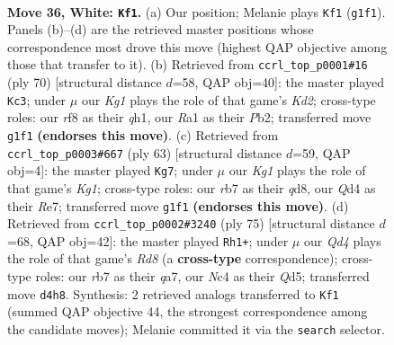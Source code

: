 \documentclass[11pt]{article}
\begin{document}
\clearpage

\begin{figure}[p]\centering
\begin{subfigure}{0.46\textwidth}\centering
\resizebox{\linewidth}{!}{%
\newchessgame
\chessboard[
  setfen={5rk1/1r5p/1p6/p7/2NQ3P/8/PP3PP1/R5K1 w - - 9 36},
  showmover=false,
  pgfstyle=straightmove, color=movearrow, markmove={g1-f1}
]}
\caption{}
\end{subfigure}\hfill
\begin{subfigure}{0.46\textwidth}\centering
\resizebox{\linewidth}{!}{%
\newchessgame
\chessboard[
  setfen={k3r3/1p3p2/p2p4/8/3Q1R1P/8/1PPK1P2/7q w - - 4 36},
  showmover=false,
  pgfstyle=straightmove, color=movearrow, markmove={d2-c3}
]}
\caption{}
\end{subfigure}
\\[4pt]
\begin{subfigure}{0.46\textwidth}\centering
\resizebox{\linewidth}{!}{%
\newchessgame
\chessboard[
  setfen={3Q2k1/4r2p/p3q1p1/1p6/8/7P/P4PP1/2R3K1 b - - 3 32},
  showmover=false,
  pgfstyle=straightmove, color=movearrow, markmove={g8-g7}
]}
\caption{}
\end{subfigure}\hfill
\begin{subfigure}{0.46\textwidth}\centering
\resizebox{\linewidth}{!}{%
\newchessgame
\chessboard[
  setfen={8/Q7/2p2kp1/3qp2p/8/1P5P/2R2PPK/3r4 b - - 2 38},
  showmover=false,
  pgfstyle=straightmove, color=movearrow, markmove={d1-h1}
]}
\caption{}
\end{subfigure}
\caption{\textbf{Move 36, White: \texttt{Kf1}.} (a) Our position; Melanie plays \texttt{Kf1} (\texttt{g1f1}). Panels (b)--(d) are the retrieved master positions whose correspondence most drove this move (highest QAP objective among those that transfer to it). (b) Retrieved from \texttt{ccrl\_top\_p0001\#16} (ply 70) [structural distance $d$=58, QAP obj=40]: the master played \texttt{Kc3}; under $\mu$ our \emph{Kg1} plays the role of that game's \emph{Kd2}; cross-type roles: our \emph{r}f8 as their \emph{q}h1, our \emph{R}a1 as their \emph{P}b2; transferred move \texttt{g1f1} \textbf{(endorses this move)}. (c) Retrieved from \texttt{ccrl\_top\_p0003\#667} (ply 63) [structural distance $d$=59, QAP obj=4]: the master played \texttt{Kg7}; under $\mu$ our \emph{Kg1} plays the role of that game's \emph{Kg1}; cross-type roles: our \emph{r}b7 as their \emph{q}d8, our \emph{Q}d4 as their \emph{R}e7; transferred move \texttt{g1f1} \textbf{(endorses this move)}. (d) Retrieved from \texttt{ccrl\_top\_p0002\#3240} (ply 75) [structural distance $d$=68, QAP obj=42]: the master played \texttt{Rh1+}; under $\mu$ our \emph{Qd4} plays the role of that game's \emph{Rd8} (a \textbf{cross-type} correspondence); cross-type roles: our \emph{r}b7 as their \emph{q}a7, our \emph{N}c4 as their \emph{Q}d5; transferred move \texttt{d4h8}. Synthesis: 2 retrieved analogs transferred to \texttt{Kf1} (summed QAP objective 44, the strongest correspondence among the candidate moves); Melanie committed it via the \texttt{search} selector.}
\label{fig:thought-m70}
\end{figure}
\end{document}
